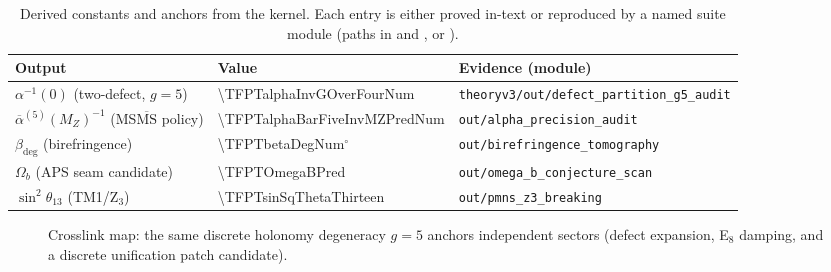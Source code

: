 \begin{table}[H]
\centering
\begin{tabular}{@{}lll@{}}
\toprule
Output & Value & Evidence (module) \\
\midrule
$\alpha^{-1}(0)$ (two-defect, $g=5$) & \num[round-mode=places,round-precision=12]{\TFPTalphaInvGOverFourNum} & \texttt{theoryv3/out/defect\_partition\_g5\_audit} \\
$\overline{\alpha}^{(5)}(M_Z)^{-1}$ (MS$\overline{\mathrm{MS}}$ policy) & \num[round-mode=places,round-precision=6]{\TFPTalphaBarFiveInvMZPredNum} & \texttt{out/alpha\_precision\_audit} \\
$\beta_{\mathrm{deg}}$ (birefringence) & \num[round-mode=places,round-precision=4]{\TFPTbetaDegNum}$^\circ$ & \texttt{out/birefringence\_tomography} \\
$\Omega_b$ (APS seam candidate) & \num[round-mode=places,round-precision=6]{\TFPTOmegaBPred} & \texttt{out/omega\_b\_conjecture\_scan} \\
$\sin^2\theta_{13}$ (TM1/Z$_3$) & \num[round-mode=places,round-precision=6]{\TFPTsinSqThetaThirteen} & \texttt{out/pmns\_z3\_breaking} \\
\bottomrule
\end{tabular}
\caption{Derived constants and anchors from the kernel. Each entry is either proved in-text or reproduced by a named suite module (paths in  and , or ).}
\label{tab:constant-factory}
\end{table}

\begin{figure}[H]
\centering
{}
\caption{Crosslink map: the same discrete holonomy degeneracy $g=5$ anchors independent sectors (defect expansion, E$_8$ damping, and a discrete unification patch candidate).}
\label{fig:crosslink}
\end{figure}

